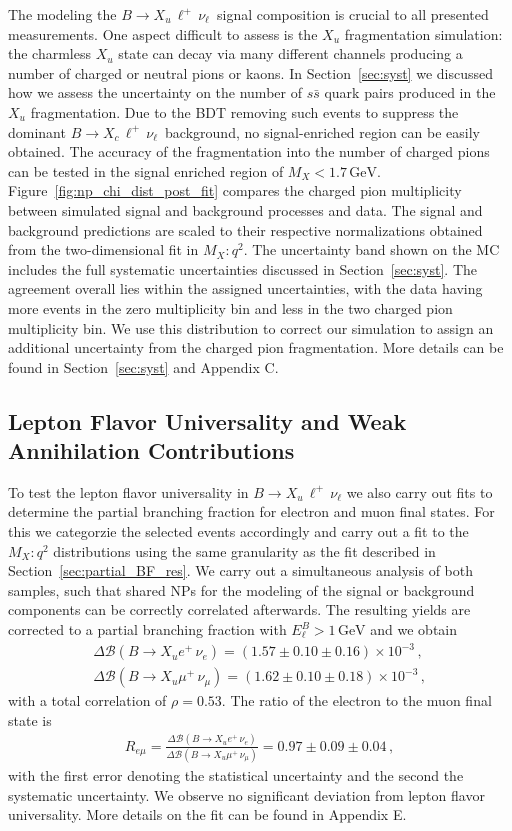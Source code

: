 \documentclass[twocolumn,aps,prd,superscriptaddress,nofootinbib,floatfix,preprintnumbers,a4]{revtex4-1}
\newcommand{\bfResdEl}{\ensuremath{\Delta \mathcal{B}(B \to X_u e^+ \, \nu_e) = \left( 1.57 \pm 0.10  \pm 0.16 \right) \times 10^{-3}}\xspace}
\newcommand{\bfResdMu}{\ensuremath{\Delta \mathcal{B}(B \to X_u \mu^+ \, \nu_\mu) = \left( 1.62 \pm 0.10  \pm 0.18 \right) \times 10^{-3}}\xspace}
\newcommand{\rElMu}{\ensuremath{ R_{e\mu} = \frac{\Delta \mathcal{B}(B \to X_u e^+ \, \nu_e)}{\Delta \mathcal{B}(B \to X_u \mu^+ \, \nu_\mu)} = 0.97 \pm 0.09 \pm 0.04 }\xspace}
\newcommand{\bulnu}{\ensuremath{B \to X_u \, \ell^+\, \nu_{\ell}}\xspace}
\newcommand{\bclnu}{\ensuremath{B \to X_c \, \ell^+\, \nu_{\ell}}\xspace}
\begin{document}
The modeling the \bulnu\ signal composition is crucial to all presented measurements. One aspect difficult to assess is the $X_u$ fragmentation simulation: the charmless $X_u$ state can decay via many different channels producing a number of charged or neutral pions or kaons. In Section~\ref{sec:syst} we discussed how we assess the uncertainty on the number of $s \bar s$ quark pairs produced in the $X_u$ fragmentation. Due to the BDT removing such events to suppress the dominant \bclnu\ background, no signal-enriched region can be easily obtained. The accuracy of the fragmentation into the number of charged pions can be tested in the signal enriched region of $M_X < 1.7 \, \mathrm{GeV}$. Figure~\ref{fig:np_chi_dist_post_fit} compares the charged pion multiplicity between simulated signal and background processes and data. The signal and background predictions are scaled to their respective normalizations obtained from the two-dimensional fit in $M_{X}:q^2$. The uncertainty band shown on the MC includes the full systematic uncertainties discussed in Section~\ref{sec:syst}. The agreement overall lies within the assigned uncertainties, with the data having more events in the zero multiplicity bin and less in the two charged pion multiplicity bin. We use this distribution to correct our simulation to assign an additional uncertainty from the charged pion fragmentation. More details can be found in Section~\ref{sec:syst} and Appendix C. 



\subsection{Lepton Flavor Universality and Weak Annihilation Contributions}

To test the lepton flavor universality in \bulnu we also carry out fits to determine the partial branching fraction for electron and muon final states. For this we categorzie the selected events accordingly and carry out a fit to the $M_X:q^2$ distributions using the same granularity as the fit described in Section~\ref{sec:partial_BF_res}. We carry out a simultaneous analysis of both samples, such that shared NPs for the modeling of the signal or background components can be correctly correlated afterwards. The resulting yields are corrected to a partial branching fraction with $E_\ell^B > 1 \, \text{GeV}$ and we obtain 
\begin{align}
\bfResdEl \, , \\
\bfResdMu \, ,
\end{align}
with a total correlation of $\rho = 0.53$. The ratio of the electron to the muon final state is
\begin{align}
\rElMu \, ,
\end{align}
with the first error denoting the statistical uncertainty and the second the systematic uncertainty. We observe no significant deviation from lepton flavor universality. More details on the fit can be found in Appendix E.
\end{document}
